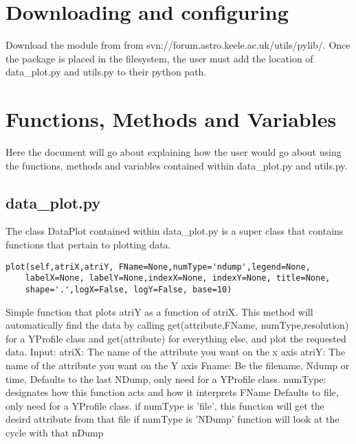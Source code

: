 \section{Downloading and configuring}
Download the module from from svn://forum.astro.keele.ac.uk/utils/pylib/.   Once the package is placed in the filesystem, the user must add the location
of data\_plot.py and utils.py to their python path.

\section{Functions, Methods and Variables}
Here the document will go about explaining how the user would go about using the functions, methods and variables
contained within data\_plot.py and utils.py.

\subsection{data\_plot.py}
The class DataPlot contained within data\_plot.py is a super class that contains functions that pertain to plotting data.
\newline
\begin{verbatim}
plot(self,atriX,atriY, FName=None,numType='ndump',legend=None,
    labelX=None, labelY=None,indexX=None, indexY=None, title=None, 
    shape='.',logX=False, logY=False, base=10)
\end{verbatim}	
Simple function that plots atriY as a function of atriX. This method will automatically find the data by calling
get(attribute,FName, numType,resolution) for a YProfile class and get(attribute) for everything else, and plot the requested data.\newline
		Input:\newline
		atriX: The name of the attribute you want on the x axis \newline
		atriY: The name of the attribute you want on the Y axis \newline
		Fname: Be the filename, Ndump or time, Defaults to the last 
			NDump, only need for a YProfile class.\newline
		numType: designates how this function acts and how it interprets 
			FName Defaults to file, only need for a YProfile class.\newline
		if numType is 'file', this function will get the desird attribute from that file\newline
		if numType is 'NDump' function will look at the cycle with that nDump\newline
